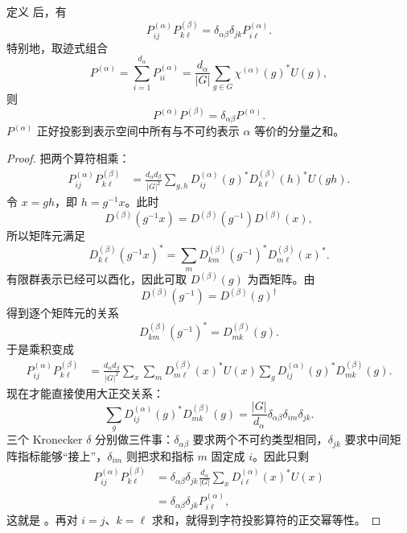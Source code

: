 \begin{theorem}[群论投影算符的乘法规则]
定义  后，有
\[
P_{ij}^{(\alpha)}P_{k\ell}^{(\beta)}
=\delta_{\alpha\beta}\delta_{jk}
P_{i\ell}^{(\alpha)}.
\label{eq:projector-matrix-unit-law}
\]
特别地，取迹式组合
\[
P^{(\alpha)}
=\sum_{i=1}^{d_\alpha}P_{ii}^{(\alpha)}
=\frac{d_\alpha}{|G|}
\sum_{g\in G}\chi^{(\alpha)}(g)^*U(g),
\label{eq:character-projector}
\]
则
\[
P^{(\alpha)}P^{(\beta)}
=\delta_{\alpha\beta}P^{(\alpha)}.
\]
$P^{(\alpha)}$ 正好投影到表示空间中所有与不可约表示 $\alpha$ 等价的分量之和。
\label{thm:group-projectors}

\end{theorem}

\begin{proof}
把两个算符相乘：
\begin{align*}
P_{ij}^{(\alpha)}P_{k\ell}^{(\beta)}
&=\frac{d_\alpha d_\beta}{|G|^2}
\sum_{g,h}
D_{ij}^{(\alpha)}(g)^*
D_{k\ell}^{(\beta)}(h)^*
U(gh).
\end{align*}
令 $x=gh$，即 $h=g^{-1}x$。此时
\[
D^{(\beta)}(g^{-1}x)
=D^{(\beta)}(g^{-1})D^{(\beta)}(x),
\]
所以矩阵元满足
\[
D_{k\ell}^{(\beta)}(g^{-1}x)^*
=\sum_m
D_{km}^{(\beta)}(g^{-1})^*
D_{m\ell}^{(\beta)}(x)^*.
\]
有限群表示已经可以酉化，因此可取 $D^{(\beta)}(g)$ 为酉矩阵。由
\[
D^{(\beta)}(g^{-1})=D^{(\beta)}(g)^\dagger
\]
得到逐个矩阵元的关系
\[
D_{km}^{(\beta)}(g^{-1})^*=D_{mk}^{(\beta)}(g).
\]
于是乘积变成
\begin{align*}
P_{ij}^{(\alpha)}P_{k\ell}^{(\beta)}
&=\frac{d_\alpha d_\beta}{|G|^2}
\sum_x\sum_m
D_{m\ell}^{(\beta)}(x)^*U(x)
\sum_g D_{ij}^{(\alpha)}(g)^*D_{mk}^{(\beta)}(g).
\end{align*}
现在才能直接使用大正交关系：
\[
\sum_g D_{ij}^{(\alpha)}(g)^*D_{mk}^{(\beta)}(g)
=\frac{|G|}{d_\alpha}
\delta_{\alpha\beta}\delta_{im}\delta_{jk}.
\]
三个 Kronecker \(\delta\) 分别做三件事：$\delta_{\alpha\beta}$ 要求两个不可约类型相同，$\delta_{jk}$ 要求中间矩阵指标能够“接上”，$\delta_{im}$ 则把求和指标 $m$ 固定成 $i$。因此只剩
\begin{align*}
P_{ij}^{(\alpha)}P_{k\ell}^{(\beta)}
&=\delta_{\alpha\beta}\delta_{jk}
\frac{d_\alpha}{|G|}
\sum_xD_{i\ell}^{(\alpha)}(x)^*U(x)\\
&=\delta_{\alpha\beta}\delta_{jk}P_{i\ell}^{(\alpha)},
\end{align*}
这就是 。再对 $i=j$、$k=\ell$ 求和，就得到字符投影算符的正交幂等性。
\end{proof}

